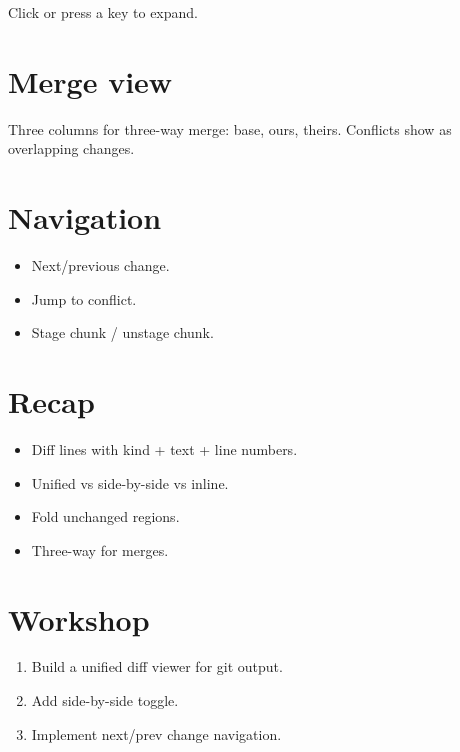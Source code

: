 Click or press a key to expand.

\section{Merge view}

Three columns for three-way merge: base, ours, theirs.
Conflicts show as overlapping changes.

\section{Navigation}

\begin{itemize}[leftmargin=*]
  \item Next/previous change.
  \item Jump to conflict.
  \item Stage chunk / unstage chunk.
\end{itemize}

\section{Recap}

\begin{recap}
\begin{itemize}[leftmargin=*]
  \item Diff lines with kind + text + line numbers.
  \item Unified vs side-by-side vs inline.
  \item Fold unchanged regions.
  \item Three-way for merges.
\end{itemize}
\end{recap}

\section*{Workshop}

\begin{enumerate}[leftmargin=*]
  \item Build a unified diff viewer for git output.
  \item Add side-by-side toggle.
  \item Implement next/prev change navigation.
\end{enumerate}
